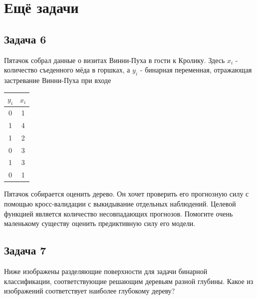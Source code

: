 \documentclass[12pt, a4paper, oneside]{article}
\begin{document}
\section{Ещё задачи} 

\subsection*{Задача 6}

Пятачок собрал данные о визитах Винни-Пуха в гости к Кролику. Здесь $x_i$ - количество съеденного мёда в горшках, а $y_i$  - бинарная переменная, отражающая застревание Винни-Пуха при входе 

\begin{center}
	\begin{tabular}{c|c}
		$y_i$ & $x_i$ \\
		\hline
		0  & 1 \\
		1 & 4\\
		1 & 2\\
		0 & 3 \\
		1 & 3 \\
		0 & 1
	\end{tabular}
\end{center}

Пятачок собирается оценить дерево. Он хочет проверить его прогнозную силу с помощью кросс-валидации с выкидывание отдельных  наблюдений. Целевой функцией является количество несовпадающих прогнозов. Помогите очень маленькому существу оценить предиктивную силу его модели.





\subsection*{Задача 7} 

Ниже изображены разделяющие поверхности для задачи бинарной классификации, соответствующие решающим деревьям разной глубины. Какое из изображений соответствует наиболее глубокому дереву?
\end{document}
